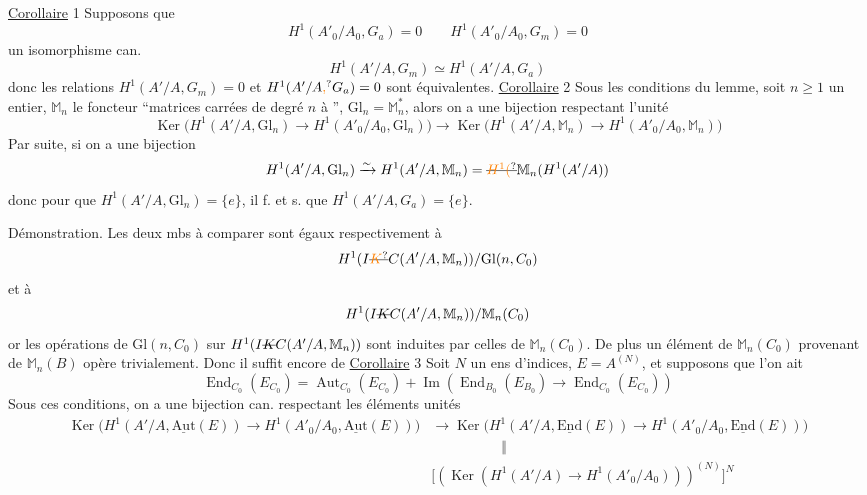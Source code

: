 \uline{Corollaire} 1 Supposons que
\[
H^1(A'_0/A_0,G_a)=0\qquad H^1(A'_0/A_0,G_m)=0
\]
  un  isomorphisme can.
\[
H^1(A'/A,G_m)\simeq H^1(A'/A,G_a)
\]
donc les relations $H^1(A'/A,G_m)=0$ et
$H^1(A'/A\unsure{,}G_a)=0$ sont équivalentes.
\uline{Corollaire} 2 Sous les conditions du lemme, soit
$n\geq1$ un entier, $\mathbb M_n$ le foncteur ``matrices
carrées de degré $n$ à '', $\mathrm{Gl}_n=\mathbb M_n^*$, alors on
a une bijection respectant l'unité
\[
\operatorname{Ker}\big(H^1(A'/A,\mathrm{Gl}_n)\to H^1(A'_0/A_0,\mathrm{Gl}_n)\big)\to
\operatorname{Ker}\big(H^1(A'/A,\mathbb M_n)\to H^1(A'_0/A_0,\mathbb M_n)\big)
\]
Par suite, si 
on a une bijection
\[
H^1(A'/A,\mathrm{Gl}_n)\xrightarrow{\sim}H^1(A'/A,\mathbb M_n)=\deleted{\unsure{H^1(}}\mathbb M_n(H^1(A'/A))
\]
donc pour que $H^1(A'/A,\mathrm{Gl}_n)=\{e\}$, il f. et s. que
$H^1(A'/A,G_a)=\{e\}$.

Démonstration. Les deux mbs à comparer
sont égaux respectivement à
\[
H^1(I\deleted{\unsure{K}}C(A'/A,\mathbb M_n))/\mathrm{Gl}(n,C_0)
\]
et à
\[
H^1(I\deleted{K}C(A'/A,\mathbb M_n))/\mathbb M_n(C_0)
\]
or les opérations de $\mathrm{Gl}(n,C_0)$ sur $H^1(I\deleted{K}C(A'/A,\mathbb M_n))$
sont induites par celles de $\mathbb M_n(C_0)$. De plus
un élément de $\mathbb M_n(C_0)$ provenant de $\mathbb M_n(B)$ opère
trivialement. Donc il suffit encore de  
\uline{Corollaire} 3 Soit $N$ un ens d'indices, 
$E=A^{(N)}$, et supposons que l'on ait
\[
\operatorname{End}_{C_0}(E_{C_0})=\operatorname{Aut}_{C_0}(E_{C_0})
+\operatorname{Im}(\operatorname{End}_{B_0}(E_{B_0})\to\operatorname{End}_{C_0}(E_{C_0}))
\]
Sous ces conditions, on a une bijection can.
respectant les éléments unités
\[
\begin{aligned}
\operatorname{Ker}\big(H^1(A'/A,\underline{\mathrm{Aut}}(E))\to H^1(A'_0/A_0,\underline{\mathrm{Aut}}(E))\big)&\to
\operatorname{Ker}\big(H^1(A'/A,\underline{\mathrm{End}}(E))\to H^1(A'_0/A_0,\underline{\mathrm{End}}(E))\big)\\
&\hspace{5em}\Vert\\
&\big[(\operatorname{Ker}(H^1(A'/A)\to H^1(A'_0/A_0)))^{(N)}\big]^{N}
\end{aligned}
\]

